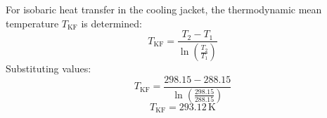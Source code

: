 For isobaric heat transfer in the cooling jacket, the thermodynamic mean temperature \( T_{\text{KF}} \) is determined:  
\[
T_{\text{KF}} = \frac{T_2 - T_1}{\ln\left(\frac{T_2}{T_1}\right)}
\]  
Substituting values:  
\[
T_{\text{KF}} = \frac{298.15 - 288.15}{\ln\left(\frac{298.15}{288.15}\right)}
\]  
\[
T_{\text{KF}} = 293.12 \, \text{K}
\]